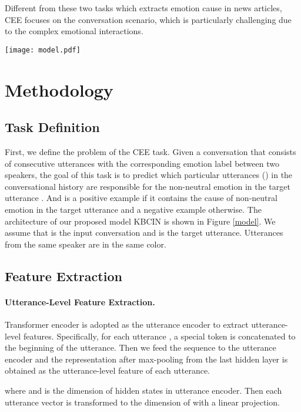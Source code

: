 \documentclass[letterpaper]{article} \usepackage{aaai23}  \usepackage{times}  \usepackage{helvet}  \usepackage{courier}  \usepackage[hyphens]{url}  \usepackage{graphicx} \urlstyle{rm} \def\UrlFont{\rm}  \usepackage{natbib}  \usepackage{caption} \frenchspacing  \setlength{\pdfpagewidth}{8.5in} \setlength{\pdfpageheight}{11in} \usepackage{algorithm}
\begin{document}
Different from these two tasks which extracts emotion cause in news articles, CEE focuses on the conversation scenario, which is particularly challenging due to the complex emotional interactions.

\begin{figure*}[htbp]
\centering
\texttt{[image: model.pdf]}
\caption{The overall architecture of our proposed model.}
\label{model}
\end{figure*}

\section{Methodology}
\subsection{Task Definition}
First, we define the problem of the CEE task. Given a conversation that consists of  consecutive utterances  with the corresponding emotion label  between two speakers, the goal of this task is to predict which particular utterances  () in the conversational history are responsible for the non-neutral emotion  in the target utterance . And  is a positive example if it contains the cause of non-neutral emotion in the target utterance and a negative example otherwise. The architecture of our proposed model KBCIN is shown in Figure \ref{model}. We assume that  is the input conversation and  is the target utterance. Utterances from the same speaker are in the same color.

\subsection{Feature Extraction}
\paragraph{Utterance-Level Feature Extraction.}
Transformer encoder \citep{trans} is adopted as the utterance encoder to extract utterance-level features. Specifically, for each utterance , a special token  is concatenated to the beginning of the utterance. Then we feed the sequence to the utterance encoder and the representation after max-pooling from the last hidden layer is obtained as the utterance-level feature of each utterance.

where  and  is the dimension of hidden states in utterance encoder. Then each utterance vector  is transformed to the dimension of  with a linear projection.
\end{document}
